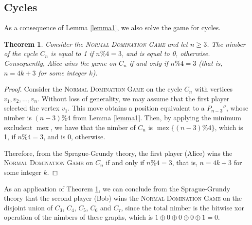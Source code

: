 \documentclass[12pt]{article}
\newtheorem{theorem}{Theorem}[section]
\DeclareMathOperator{\mex}{mex}
\newcommand{\xor}{\oplus}
\begin{document}
\subsection{Cycles}\label{sec:cycles}

As a consequence of Lemma \ref{lemma1}, we also solve the game for cycles.

\begin{theorem}\label{teo-nimb2}
Consider the \textsc{Normal Domination Game} and let $n\geq 3$. The nimber of the cycle $C_n$ is equal to 1 if $n\% 4=3$, and is equal to 0, otherwise. Consequently, Alice wins the game on $C_n$ if and only if $n\% 4=3$ (that is, $n=4k+3$ for some integer $k$).
\end{theorem}

\begin{proof}
Consider the \textsc{Normal Domination Game} on the cycle $C_n$ with vertices $v_1,v_2,\ldots,v_n$. 
Without loss of generality, we may assume that the first player selected the vertex $v_1$.
This move obtains a position equivalent to a $P_{n-3}''$, whose nimber is $(n-3)\% 4$ from Lemma \ref{lemma1}.
Then, by applying the minimum excludent $\mex$, we have that the nimber of $C_n$ is $\mex\{(n-3)\% 4\}$, which is 1, if $n\% 4=3$, and is 0, otherwise.

Therefore, from the Sprague-Grundy theory, the first player (Alice) wins the \textsc{Normal Domination Game} on $C_n$ if and only if $n\% 4=3$, that is, $n=4k+3$ for some integer $k$.
\end{proof}


As an application of Theorem \ref{teo-nimb2}, we can conclude from the Sprague-Grundy theory that the second player (Bob) wins the \textsc{Normal Domination Game} on the disjoint union of $C_3$, $C_4$, $C_5$, $C_6$ and $C_7$, since the total nimber is the bitwise xor operation of the nimbers of these graphs, which is $1\xor 0\xor 0\xor 0\xor 1=0$.
\end{document}
